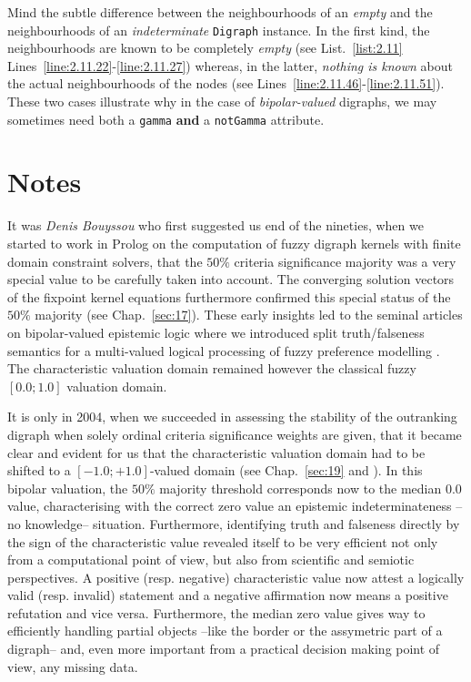 Mind the subtle difference between the neighbourhoods of an \emph{empty} and the neighbourhoods of an \emph{indeterminate} \texttt{Digraph} instance. In the first kind, the neighbourhoods are known to be completely \emph{empty}  (see List.~\vref{list:2.11} Lines~\ref{line:2.11.22}-\ref{line:2.11.27}) whereas, in the latter, \emph{nothing is known} about the actual neighbourhoods of the nodes  (see Lines~\ref{line:2.11.46}-\ref{line:2.11.51}). These two cases illustrate why in the case of \emph{bipolar-valued} digraphs, we may sometimes need both a \texttt{gamma} \textbf{and} a \texttt{notGamma} attribute.


{}
\section*{Notes}

It was \emph{Denis Bouyssou}  who first suggested us end of the nineties, when we started to work in Prolog on the computation of fuzzy digraph kernels with finite domain constraint solvers, that the $50\%$ criteria significance majority was a very special value to be carefully taken into account. The converging solution vectors of the fixpoint kernel equations furthermore confirmed this special status of the $50\%$ majority (see Chap.~\ref{sec:17}). These early insights led to the seminal articles on bipolar-valued epistemic logic where we introduced split truth/falseness semantics for a multi-valued logical processing of fuzzy preference modelling \citep{BIS-2000,BIS-2002}. The characteristic valuation domain remained however the classical fuzzy $[0.0;1.0]$ valuation domain.

It is only in 2004, when we succeeded in assessing the stability of the outranking digraph when solely ordinal criteria significance weights are given, that it became clear and evident for us that the characteristic valuation domain had to be shifted to a $[-1.0;+1.0]$-valued domain (see Chap.~\ref{sec:19} and \citet{BIS-2004a}). In this bipolar valuation, the $50\%$ majority threshold corresponds now to the median $0.0$ value, characterising with the correct zero value an epistemic indeterminateness --no knowledge-- situation. Furthermore, identifying truth and falseness directly by the sign of the characteristic value revealed itself to be very efficient not only from a computational point of view, but also from scientific and semiotic perspectives. A positive (resp. negative) characteristic value now attest a logically valid (resp. invalid) statement and a negative affirmation now means a positive refutation and vice versa. Furthermore, the median zero value gives way to efficiently handling partial objects --like the border or the assymetric part of a digraph-- and, even more important from a practical decision making point of view, any missing data.

